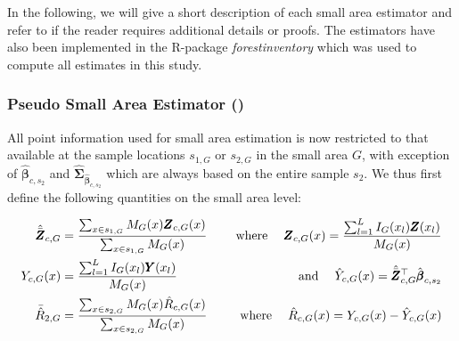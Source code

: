  In the following, we will give a short description of each small area estimator and refer to \citet{mandallaz2013a, mandallaz2016, mandallaz2013b} if the reader requires additional details or proofs. The estimators have also been implemented in the R-package \textit{forestinventory} \citep{forestinventory} which was used to compute all estimates in this study.\\



\subsubsection{Pseudo Small Area Estimator (\psmall{})}
\label{sec:psmall}

All point information used for small area estimation is now restricted to that available at the sample locations $s_{1,G}$ or $s_{2,G}$ in the small area $G$, with exception of $\hat{\pmb{\beta}}_{c,s_2}$ and $\hat{\pmb{\Sigma}}_{\hat{\pmb{\beta}}_{c,s_2}}$ which are always based on the entire sample $s_2$. We thus first define the following quantities on the small area level:

\begin{subequations}\label{eq:compsG}
	\begin{align}
	\hat{\bar{\pmb{Z}}}_{c,G} &= \frac{\sum_{x \in s_{1,G}} M_{G}(x) \pmb{Z}_{c,G}(x)}{\sum_{x \in s_{1,G}} M_{G}(x)} \label{eq:meanZcG} \hspace{3ex} &\text{where} \hspace{3ex}
	\pmb{Z}_{c,G}(x) =  \frac{\sum_{l=1}^{L} I_{G}(x_l)\pmb{Z}(x_l)}{M_{G}(x)}\\		
	Y_{c,G}(x) &= \frac{\sum_{l=1}^{L} I_{G}(x_l)\pmb{Y}(x_l)}{M_{G}(x)}  &\text{and} \hspace{3ex}
	\hat{Y}_{c,G}(x)=\hat{\bar{\pmb{Z}}}_{c,G}^{\top}\hat{\pmb{\beta}}_{c,s_2}\\
	\bar{\hat{R}}_{2,G} &= \frac{\sum_{x \in s_{2,G}} M_{G}(x) \hat{R}_{c,G}(x)}{\sum_{x \in s_{2,G}} M_{G}(x)} \hspace{3ex} &\text{where} \hspace{3ex}
	\hat{R}_{c,G}(x) = Y_{c,G}(x)-\hat{Y}_{c,G}(x)
	\end{align}
\end{subequations}

